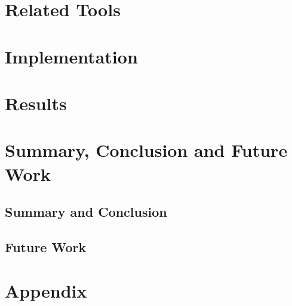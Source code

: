 \documentclass[conference]{IEEEtran}
\begin{document}
\section{Related Tools}



\section{Implementation}
\label{sec:impl}



\section{Results}
\label{sec:res}
%
%

%


    

\section{Summary, Conclusion and Future Work}
\subsection{Summary and Conclusion}
\subsection{Future Work}




\section{Appendix}



   




%
%
\end{document}
